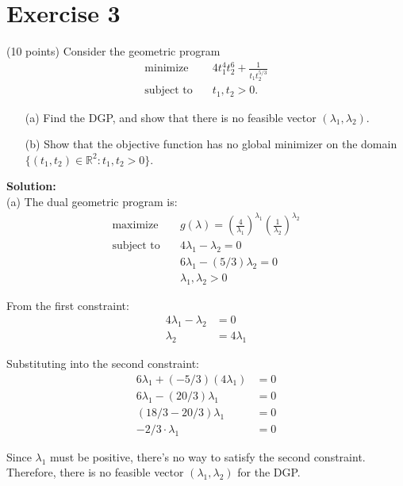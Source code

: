 \documentclass{article}
\begin{document}
\newpage

\section*{Exercise 3}
(10 points) Consider the geometric program
\begin{align*}
\text{minimize} \quad & 4t_1^4 t_2^6 + \frac{1}{t_1 t_2^{5/3}} \\
\text{subject to} \quad & t_1, t_2 > 0.
\end{align*}

\begin{itemize}
    \item[(a)] Find the DGP, and show that there is no feasible vector $(\lambda_1, \lambda_2)$.
    \item[(b)] Show that the objective function has no global minimizer on the domain $\{(t_1, t_2) \in \mathbb{R}^2 : t_1, t_2 > 0\}$.
\end{itemize}

\textbf{Solution:} \\

(a) The dual geometric program is:
\begin{align*}
\text{maximize} \quad & g(\lambda) = \left(\frac{4}{\lambda_1}\right)^{\lambda_1} \left(\frac{1}{\lambda_2}\right)^{\lambda_2} \\
\text{subject to} \quad & 4 \lambda_1 - \lambda_2 = 0 \\
& 6 \lambda_1 - (5/3) \lambda_2 = 0 \\
& \lambda_1, \lambda_2 > 0
\end{align*}

From the first constraint:
\begin{align*}
4\lambda_1 - \lambda_2 &= 0 \\
\lambda_2 &= 4\lambda_1
\end{align*}

Substituting into the second constraint:
\begin{align*}
6\lambda_1 + (-5/3)(4\lambda_1) &= 0 \\
6\lambda_1 - (20/3)\lambda_1 &= 0 \\
(18/3 - 20/3)\lambda_1 &= 0 \\
-2/3 \cdot \lambda_1 &= 0
\end{align*}

Since $\lambda_1$ must be positive, there's no way to satisfy the second constraint. \\

Therefore, there is no feasible vector $(\lambda_1, \lambda_2)$ for the DGP. \\
\end{document}
